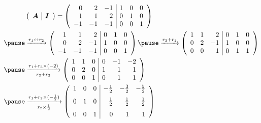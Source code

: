 \begin{frame}\ft{\secname}
\begin{jie}

$$
\begin{aligned}
&\left(
  \begin{array}{c|c}
    \A & \II
  \end{array}
\right)=\left(
  \begin{array}{rrr|rrr}
    0 &  2 & -1 &  1 & 0 & 0\\
    1 &  1 &  2 &  0 & 1 & 0\\
    -1 & -1 & -1 &  0 & 0 & 1\\              
  \end{array}
\right) \\ \pause
&\xrightarrow[]{r_1\leftrightarrow r_2}\left(
  \begin{array}{rrr|rrr}
    1 &  1 &  2 &  0 & 1 & 0\\
    0 &  2 & -1 &  1 & 0 & 0\\
    -1 & -1 & -1 &  0 & 0 & 1\\          
  \end{array}
\right) \pause
\xrightarrow[]{r_3+ r_1}\left(
  \begin{array}{rrr|rrr}
    1 &  1 &  2 & 0 & 1 & 0\\
    0 &  2 & -1 & 1 & 0 & 0\\
    0 &  0 &  1 & 0 & 1 & 1\\          
  \end{array}
\right)\\\pause
&\xrightarrow[r_2+r_3]{r_1+ r_3\times(-2)}\left(
  \begin{array}{rrr|rrr}
    1 &  1 &  0  & 0 &-1 &-2\\
    0 &  2 &  0  & 1 & 1 & 1\\
    0 &  0 &  1  & 0 & 1 & 1\\    
  \end{array}
\right)\\\pause
&\xrightarrow[r_2\times \frac12]{r_1+ r_2\times(-\frac12)}\left(
  \begin{array}{rrr|rrr}
    1 &  0 &  0  & -\frac12 &-\frac32 &-\frac52\\[.1in]
    0 &  1 &  0  & \frac12 & \frac12 & \frac12 \\[.1in]
    0 &  0 &  1  & 0 & 1 & 1                   
  \end{array}
\right)    
\end{aligned}
$$
\end{jie}
\end{frame}


